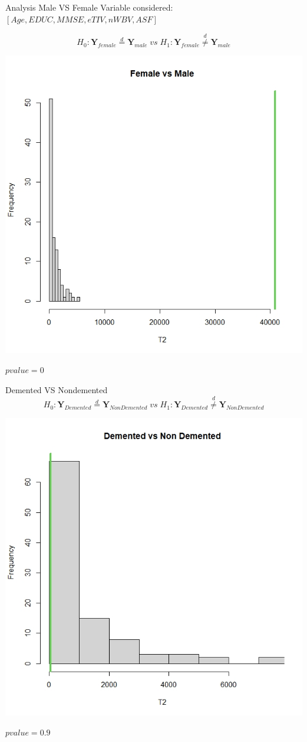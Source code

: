 \documentclass{beamer}
\begin{document}
	\begin{frame}{Analysis Male VS Female}
		\vspace{0.1cm}
		Variable considered: $[Age,EDUC,MMSE,eTIV,nWBV,ASF]$ 
		\vspace{-0.2cm}
		
	$$
	H_0: \mathbf{Y}_{female} \overset{d}{=} \mathbf{Y}_{male}\;vs\;H_1:\mathbf{Y}_{female} \overset{d}{\neq} \mathbf{Y}_{male}
	$$
	 
	\begin{center}
		\includegraphics[width=0.45\columnwidth]{histmvsf.jpeg}
	\end{center}
	\vspace{-0.7cm}
	$pvalue= 0 $
	\end{frame}


	\begin{frame}{Demented VS Nondemented }
	\vspace{-0.3cm}
		$$
	H_0: \mathbf{Y}_{Demented} \overset{d}{=} \mathbf{Y}_{Non Demented}\;vs\;H_1:\mathbf{Y}_{Demented} \overset{d}{\neq} \mathbf{Y}_{Non Demented}
	$$
	
 	\begin{center}
 		\includegraphics[width=0.5\columnwidth]{histdemvsnondem.jpeg}
 	\end{center}
 	\vspace{-0.7cm}
 	$pvalue= 0.9 $
	\end{frame}
	
\end{document}
